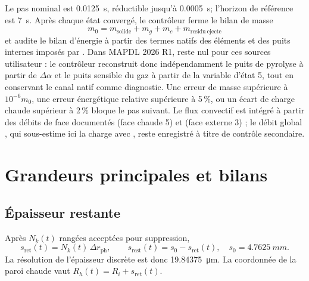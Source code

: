 \documentclass[oneside,openany]{amsdtx}
\begin{document}
Le pas nominal est \SI{0.0125}{s}, réductible jusqu'à \SI{0.0005}{s}; l'horizon
de référence est \SI{7}{s}. Après chaque état convergé, le contrôleur ferme le
bilan de masse
\begin{equation}
 m_0=m_{\mathrm{solide}}+m_g+m_c+m_{\mathrm{residu\ ejecte}}
\end{equation}
et audite le bilan d'énergie à partir des termes natifs des éléments et des
puits internes imposés par . Dans MAPDL 2026 R1,
 reste nul pour ces sources utilisateur : le contrôleur
reconstruit donc indépendamment le puits de pyrolyse à partir de
\(\Delta\alpha\) et le puits sensible du gaz à partir de la variable d'état 5,
tout en conservant le canal natif comme diagnostic. Une erreur de masse
supérieure à \(10^{-6}m_0\), une erreur énergétique relative supérieure à
5\,\%, ou un écart de charge chaude supérieur à 2\,\% bloque le pas suivant.
Le flux convectif est intégré à partir des débits de face documentés
 (face chaude 5) et  (face externe 3) ; le débit
global , qui sous-estime ici la charge avec ,
reste enregistré à titre de contrôle secondaire.

\begin{center}\end{center}

\section{Grandeurs principales et bilans}
\subsection{Épaisseur restante}
Après \(N_k(t)\) rangées acceptées pour suppression,
\[
s_{\mathrm{ret}}(t)=N_k(t)\,\Delta r_{\mathrm{ph}},\qquad
s_{\mathrm{rest}}(t)=s_0-s_{\mathrm{ret}}(t),
\quad s_0=\SI{4.7625}{mm}.
\]
La résolution de l'épaisseur discrète est donc \SI{19.84375}{\micro m}. La
coordonnée de la paroi chaude vaut \(R_h(t)=R_i+s_{\mathrm{ret}}(t)\).
\end{document}
